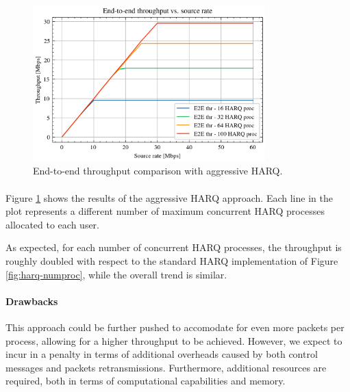 \begin{figure}[ht]
    \centering
    \includegraphics[width=0.8\textwidth]{res/aggressive_harq.png}
    \caption{End-to-end throughput comparison with aggressive \ac{HARQ}.}
    \label{fig:aggressive}
\end{figure}

\paragraph{}
Figure \ref{fig:aggressive} shows the results of the aggressive \ac{HARQ} approach. Each line in the plot represents a different number of maximum concurrent \ac{HARQ} processes allocated to each user. 

As expected, for each number of concurrent \ac{HARQ} processes, the throughput is roughly doubled with respect to the standard \ac{HARQ} implementation of Figure \ref{fig:harq-numproc}, while the overall trend is similar.

\paragraph{Drawbacks}
This approach could be further pushed to accomodate for even more packets per process, allowing for a higher throughput to be achieved. However, we expect to incur in a penalty in terms of additional overheads caused by both control messages and packets retransmissions. Furthermore, additional resources are required, both in terms of computational capabilities and memory. 

